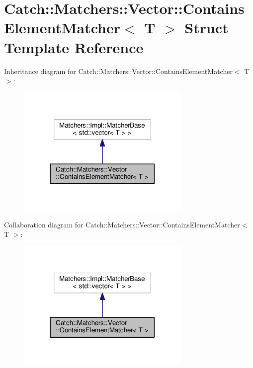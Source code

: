 \hypertarget{structCatch_1_1Matchers_1_1Vector_1_1ContainsElementMatcher}{}\section{Catch\+:\+:Matchers\+:\+:Vector\+:\+:Contains\+Element\+Matcher$<$ T $>$ Struct Template Reference}
\label{structCatch_1_1Matchers_1_1Vector_1_1ContainsElementMatcher}


Inheritance diagram for Catch\+:\+:Matchers\+:\+:Vector\+:\+:Contains\+Element\+Matcher$<$ T $>$\+:\nopagebreak
\begin{figure}[H]
\begin{center}
\leavevmode
\includegraphics[width=237pt]{structCatch_1_1Matchers_1_1Vector_1_1ContainsElementMatcher__inherit__graph}
\end{center}
\end{figure}


Collaboration diagram for Catch\+:\+:Matchers\+:\+:Vector\+:\+:Contains\+Element\+Matcher$<$ T $>$\+:\nopagebreak
\begin{figure}[H]
\begin{center}
\leavevmode
\includegraphics[width=237pt]{structCatch_1_1Matchers_1_1Vector_1_1ContainsElementMatcher__coll__graph}
\end{center}
\end{figure}
